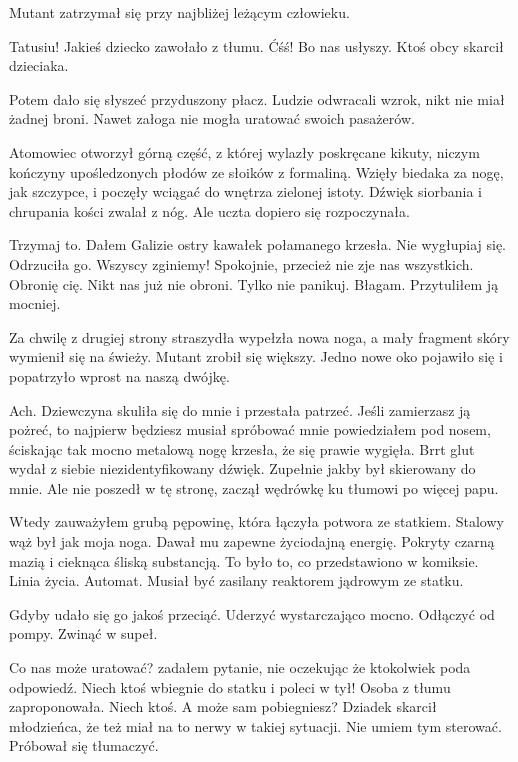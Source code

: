 Mutant zatrzymał się przy najbliżej leżącym człowieku.
\begin{dialogue}
	\ds{} Tatusiu! \dm{} Jakieś dziecko zawołało z tłumu.
	\ds{} Ćśś! Bo nas usłyszy. \dm{} Ktoś obcy skarcił dzieciaka.
\end{dialogue}

Potem dało się słyszeć przyduszony płacz.
Ludzie odwracali wzrok, nikt nie miał żadnej broni.
Nawet załoga nie mogła uratować swoich pasażerów.

Atomowiec otworzył górną część, z której wylazły poskręcane kikuty, niczym kończyny upośledzonych płodów ze słoików z formaliną.
Wzięły biedaka za nogę, jak szczypce, i poczęły wciągać do wnętrza zielonej istoty.
Dźwięk siorbania i chrupania kości zwalał z nóg.
Ale uczta dopiero się rozpoczynała.

\begin{dialogue}
	\ds{} Trzymaj to. \dm{} Dałem Galizie ostry kawałek połamanego krzesła.
	\ds{} Nie wygłupiaj się. \dm{} Odrzuciła go. \dm{} Wszyscy zginiemy!
	\ds{} Spokojnie, przecież nie zje nas wszystkich. Obronię cię.
	\ds{} Nikt nas już nie obroni.
	\ds{} Tylko nie panikuj. Błagam. \dm{} Przytuliłem ją mocniej.
\end{dialogue}

Za chwilę z drugiej strony straszydła wypełzła nowa noga, a mały fragment skóry wymienił się na świeży.
Mutant zrobił się większy.
Jedno nowe oko pojawiło się i popatrzyło wprost na naszą dwójkę.
\begin{dialogue}
	\ds{} Ach. \dm{} Dziewczyna skuliła się do mnie i przestała patrzeć.
	\ds{} Jeśli zamierzasz ją pożreć, to najpierw będziesz musiał spróbować mnie \dm{} powiedziałem pod nosem, ściskając tak mocno metalową nogę krzesła, że się prawie wygięła.
	\ds{} Brrt \dm{} glut wydał z siebie niezidentyfikowany dźwięk. Zupełnie jakby był skierowany do mnie. Ale nie poszedł w tę stronę, zaczął wędrówkę ku tłumowi po więcej papu.
\end{dialogue}

Wtedy zauważyłem grubą pępowinę, która łączyła potwora ze statkiem.
Stalowy wąż był jak moja noga. Dawał mu zapewne życiodajną energię.
Pokryty czarną mazią i cieknąca śliską substancją.
To było to, co przedstawiono w komiksie.
Linia życia. Automat. Musiał być zasilany reaktorem jądrowym ze statku.

Gdyby udało się go jakoś przeciąć.
Uderzyć wystarczająco mocno.
Odłączyć od pompy.
Zwinąć w supeł.

\begin{dialogue}
	\ds{} Co nas może uratować? \dm{} zadałem pytanie, nie oczekując że ktokolwiek poda odpowiedź.
	\ds{} Niech ktoś wbiegnie do statku i poleci w tył! \dm{} Osoba z tłumu zaproponowała. Niech ktoś.
	\ds{} A może sam pobiegniesz? \dm{} Dziadek skarcił młodzieńca, że też miał na to nerwy w takiej sytuacji.
	\ds{} Nie umiem tym sterować. \dm{} Próbował się tłumaczyć.
\end{dialogue}


